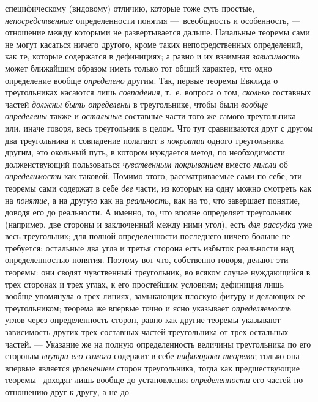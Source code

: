 \documentclass[twoside]{article}
\begin{document}
специфическому (видовому) отличию, которые тоже суть простые,
{\em непосредственные}
определенности понятия —~всеобщность и
особенность, — отношение между которыми не развертывается
дальше. Начальные теоремы сами не могут касаться ничего другого, кроме
таких непосредственных определений, как те, которые содержатся в
дефинициях; а равно и их взаимная
{\em зависимость} может
ближайшим образом иметь только тот общий характер, что одно определение
вообще {\em определено}
другим. Так, первые теоремы Евклида о треугольниках касаются
лишь {\em совпадения},
т.~е. вопроса о том,
{\em сколько} составных
частей {\em должны быть определены}
в треугольнике, чтобы были
{\em вообще определены}
также и {\em остальные}
составные части того же самого треугольника или, иначе
говоря, весь треугольник в целом. Что тут сравниваются друг с другом два
треугольника и совпадение полагают в
{\em покрытии} одного
треугольника другим, это окольный путь, в котором нуждается метод, по
необходимости долженствующий пользоваться
{\em чувственным покрыванием}
вместо {\em мысли}
об {\em определимости}
как таковой. Помимо этого, рассматриваемые сами по себе, эти
теоремы сами содержат в себе {\em две}
части, из которых на одну можно смотреть как на
{\em понятие}, а на
другую как на {\em реальность},
как на то, что завершает понятие, доводя его до реальности. А
именно, то, что вполне определяет треугольник (например, две стороны и
заключенный между ними угол), есть
{\em для рассудка} уже
весь треугольник; для полной определенности последнего ничего больше не
требуется; остальные два угла и третья сторона есть избыток реальности над
определенностью понятия. Поэтому вот что, собственно говоря,
делают эти теоремы: они сводят чувственный треугольник, во всяком случае
нуждающийся в трех сторонах и трех углах, к его простейшим условиям;
дефиниция лишь вообще упомянула о трех линиях, замыкающих плоскую фигуру и
делающих ее треугольником; теорема же впервые точно и ясно указывает
{\em определяемость}
углов через определенность сторон, равно как другие теоремы
указывают зависимость других трех составных частей треугольника от трех
остальных частей. — Указание же на полную определенность
величины треугольника по его сторонам
{\em внутри его самого}
содержит в себе
{\em пифагорова теорема};
только она впервые является
{\em уравнением} сторон
треугольника, тогда как предшествующие
теоремы~\label{bkm:bm111}
доходят лишь вообще до установления
{\em определенности} его
частей по отношению друг к другу, а не до
\end{document}
